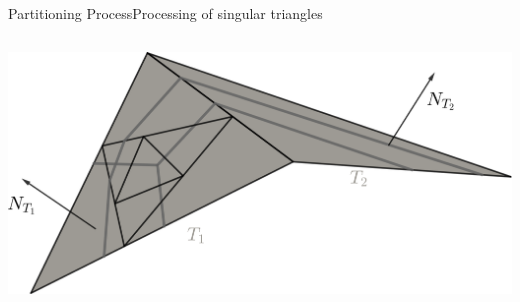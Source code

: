 \documentclass[compress,10pt,aspectratio=169]{beamer}
\begin{document}
\begin{frame}{Partitioning Process}{Processing of singular triangles}
\begin{columns}
\begin{column}{0.7\textwidth}
{\includegraphics[scale=0.2]{images/singulier_sepa_space.pdf}\hspace{0.5cm}
}
\end{column}
\end{columns}
\end{frame}
\end{document}
